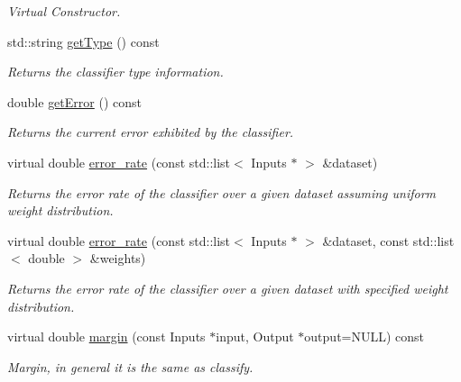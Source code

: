 \begin{DoxyCompactItemize}
\begin{DoxyCompactList}\small\item\em Virtual Constructor. \end{DoxyCompactList}\item 
std\+::string \hyperlink{classiCub_1_1boostMIL_1_1WeakClassifier_aa5de990b0baac11f35f74493ca853ac5}{get\+Type} () const 
\begin{DoxyCompactList}\small\item\em Returns the classifier type information. \end{DoxyCompactList}\item 
double \hyperlink{classiCub_1_1boostMIL_1_1WeakClassifier_a525811a7380bcfd3cbc1edbe90e0842a}{get\+Error} () const 
\begin{DoxyCompactList}\small\item\em Returns the current error exhibited by the classifier. \end{DoxyCompactList}\item 
virtual double \hyperlink{classiCub_1_1boostMIL_1_1WeakClassifier_a8f9de230214c99305df65010e5ddbe77}{error\+\_\+rate} (const std\+::list$<$ Inputs $\ast$ $>$ \&dataset)
\begin{DoxyCompactList}\small\item\em Returns the error rate of the classifier over a given dataset assuming uniform weight distribution. \end{DoxyCompactList}\item 
virtual double \hyperlink{classiCub_1_1boostMIL_1_1WeakClassifier_a294f03d21af03a5f96875562a5a979a0}{error\+\_\+rate} (const std\+::list$<$ Inputs $\ast$ $>$ \&dataset, const std\+::list$<$ double $>$ \&weights)
\begin{DoxyCompactList}\small\item\em Returns the error rate of the classifier over a given dataset with specified weight distribution. \end{DoxyCompactList}\item 
virtual double \hyperlink{classiCub_1_1boostMIL_1_1WeakClassifier_a01b3c3834f0b0b81513ed49907bb2c16}{margin} (const Inputs $\ast$input, Output $\ast$output=N\+U\+L\+L) const 
\begin{DoxyCompactList}\small\item\em Margin, in general it is the same as classify. \end{DoxyCompactList}\end{DoxyCompactItemize}
